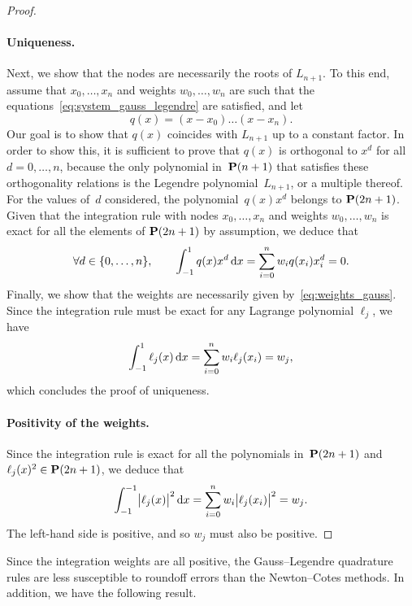 \begin{proof}
    \paragraph{Uniqueness.}
    Next,
    we show that the nodes are necessarily the roots of $L_{n+1}$.
    To this end,
    assume that $x_0, \dotsc, x_n$ and weights $w_0, \dotsc, w_n$ are such that the equations~\eqref{eq:system_gauss_legendre} are satisfied,
    and let
    \[
        q(x) = (x - x_0) \dotsc (x - x_n).
    \]
    Our goal is to show that $q(x)$ coincides with $L_{n+1}$ up to a constant factor.
    In order to show this,
    it is sufficient to prove that $q(x)$ is orthogonal to $x^d$ for all $d = 0, \dotsc, n$,
    because the only polynomial in~$\mathbf P(n+1)$ that satisfies these orthogonality relations is the Legendre polynomial~$L_{n+1}$,
    or a multiple thereof.
    For the values of~$d$ considered, the polynomial~$q(x) x^d$ belongs to $\mathbf P(2n+1)$.
    Given that the integration rule with nodes $x_0, \dotsc, x_n$ and weights $w_0,\dotsc, w_n$ is exact for all the elements of $\mathbf P(2n+1)$ by assumption,
    we deduce that
    \[
        \forall d \in \{0, \dotsc, n\},
        \qquad \int_{-1}^{1} q(x) x^d \, \mathrm d x = \sum_{i=0}^{n} w_i q(x_i) x_i^d = 0.
    \]
    Finally, we show that the weights are necessarily given by~\eqref{eq:weights_gauss}.
    Since the integration rule must be exact for any Lagrange polynomial $\ell_j$,
    we have
    \[
        \int_{-1}^{1} \ell_j(x) \, \mathrm d x = \sum_{i=0}^{n} w_i \ell_j(x_i) = w_j,
    \]
    which concludes the proof of uniqueness.
    \paragraph{Positivity of the weights.}
    Since the integration rule is exact for all the polynomials in~$\mathbf P(2n+1)$ and $\ell_j(x)^2 \in \mathbf P(2n+1)$,
    we deduce that
    \[
        \int_{-1}^{-1} \bigl\lvert \ell_j(x) \bigr\rvert^2 \, \mathrm d x
        = \sum_{i=0}^{n} w_i \bigl\lvert \ell_j(x_i) \bigr\rvert^2 = w_j.
    \]
    The left-hand side is positive,
    and so $w_j$ must also be positive.
\end{proof}

Since the integration weights are all positive,
the Gauss--Legendre quadrature rules are less susceptible to roundoff errors than the Newton--Cotes methods.
In addition, we have the following result.

